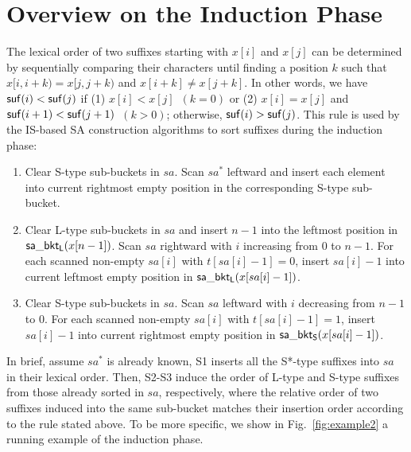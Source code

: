 \documentclass[10pt,journal,compsoc]{IEEEtran}
\begin{document}
\appendices
\section{Overview on the Induction Phase} \label{sec:appendix}

The lexical order of two suffixes starting with $x[i]$ and $x[j]$ can be determined by sequentially comparing their characters until finding a position $k$ such that $x[i, i + k) = x[j, j + k)$ and $x[i + k] \ne x[j + k]$. In other words, we have ${\sf suf}(i) < {\sf suf}(j)$ if (1) $x[i] < x[j]$~$(k = 0)$ or (2) $x[i] = x[j]$ and ${\sf suf}(i + 1) < {\sf suf}(j + 1)$~$(k > 0)$; otherwise, ${\sf suf}(i) > {\sf suf}(j)$. This rule is used by the IS-based SA construction algorithms to sort suffixes during the induction phase:

\begin{enumerate}[S1]
	\item 
	Clear S-type sub-buckets in $sa$. Scan $sa^*$ leftward and insert each element into current rightmost empty position in the corresponding S-type sub-bucket.
	
	\item 
	Clear L-type sub-buckets in $sa$ and insert $n - 1$ into the leftmost position in ${\sf sa\_bkt_L}(x[n - 1])$. Scan $sa$ rightward with $i$ increasing from $0$ to $n - 1$. For each scanned non-empty $sa[i]$ with $t[sa[i] - 1] = 0$, insert $sa[i] - 1$ into current leftmost empty position in ${\sf sa\_bkt_L}(x[sa[i] - 1])$.
	
	\item
	Clear S-type sub-buckets in $sa$. Scan $sa$ leftward with $i$ decreasing from $n - 1$ to $0$. For each scanned non-empty $sa[i]$ with $t[sa[i] - 1] = 1$, insert $sa[i] - 1$ into current rightmost empty position in ${\sf sa\_bkt_S}(x[sa[i] - 1])$.
	
\end{enumerate}

In brief, assume $sa^*$ is already known, S1 inserts all the S*-type suffixes into $sa$ in their lexical order. Then, S2-S3 induce the order of L-type and S-type suffixes from those already sorted in $sa$, respectively, where the relative order of two suffixes induced into the same sub-bucket matches their insertion order according to the rule stated above. To be more specific, we show in Fig.~\ref{fig:example2} a running example of the induction phase. 
\end{document}
